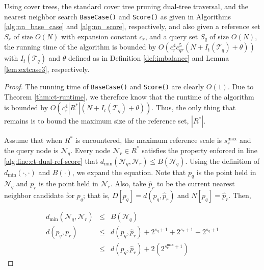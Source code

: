 \begin{thm}
Using cover trees, the standard cover tree pruning dual-tree traversal, and the
nearest neighbor search \texttt{BaseCase()} and \texttt{Score()} as given in
Algorithms \ref{alg:nn_base_case} and \ref{alg:nn_score}, respectively, and also
given a reference set $S_r$ of size $O(N)$ with expansion constant $c_r$, and a
query set $S_q$ of size $O(N)$, the running time of the algorithm is bounded by
$O(c_r^4 c_{qr}^5 (N + I_t(\mathscr{T}_q) + \theta))$ with $I_t(\mathscr{T}_q)$
and $\theta$ defined as in Definition \ref{def:imbalance} and Lemma
\ref{lem:extcase3}, respectively.
\label{thm:nns}
\end{thm}

\begin{proof}
The running time of \texttt{BaseCase()} and \texttt{Score()} are clearly $O(1)$.
Due to Theorem \ref{thm:ct-runtime}, we therefore know that the runtime of the
algorithm is bounded by $O(c_r^4 |R^*| (N + I_t(\mathscr{T}_q) + \theta))$.
Thus, the only thing that remains is to bound the maximum size of the reference
set, $|R^*|$.

Assume that when $R^*$ is encountered, the maximum reference scale is
$s_r^{\max}$ and the query node is $\mathscr{N}_q$.  Every node $\mathscr{N}_r
\in R^*$ satisfies the property enforced in line
\ref{alg:line:ct-dual-ref-score} that
$d_{\min}(\mathscr{N}_q, \mathscr{N}_r) \le B(\mathscr{N}_q)$.
Using the definition of $d_{\min}(\cdot, \cdot)$ and $B(\cdot)$, we
expand the equation.  Note that $p_q$ is the point held in $\mathscr{N}_q$ and
$p_r$ is the point held in $\mathscr{N}_r$.  Also, take $\hat{p}_r$ to be the
current nearest neighbor candidate for $p_q$; that is, $D[p_q] = d(p_q,
\hat{p}_r)$ and $N[p_q] = \hat{p}_r$.  Then,

\begin{eqnarray}
d_{\min}(\mathscr{N}_q, \mathscr{N}_r) &\le& B(\mathscr{N}_q) \\
d(p_q, p_r) &\le& d(p_q, \hat{p}_r) + 2^{s_q + 1} + 2^{s_r + 1} + 2^{s_q + 1}
\label{eqn:pr_dist} \\
 &\le& d(p_q, \hat{p}_r) + 2(2^{s_r^{\max} + 1})
\end{eqnarray}


\end{proof}
